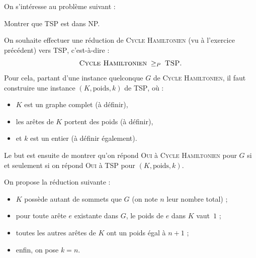 
\begingroup

\begin{exercice}

  On s’intéresse au problème suivant :



  \begin{questions}

  \item Montrer que \textsc{TSP} est dans NP.

    \medskip
    On souhaite effectuer une réduction de \textsc{Cycle Hamiltonien} (vu à l’exercice précédent) vers \textsc{TSP},  
    c’est-à-dire :
    \[
    \textsc{Cycle Hamiltonien} \;\ge_P\; \textsc{TSP}.
    \]
    Pour cela, partant d’une instance quelconque $G$ de \textsc{Cycle Hamiltonien}, il faut construire une instance $(K, \text{poids}, k)$ de \textsc{TSP}, où :
    \begin{itemize}
    \item $K$ est un graphe complet (à définir),
    \item les arêtes de $K$ portent des poids (à définir),
    \item et $k$ est un entier (à définir également).
    \end{itemize}

    Le but est ensuite de montrer qu’on répond \textsc{Oui} à \textsc{Cycle Hamiltonien} pour $G$ si et seulement si on répond \textsc{Oui} à \textsc{TSP} pour $(K, \text{poids}, k)$.

    \medskip
    On propose la réduction suivante :
    \begin{itemize}
    \item $K$ possède autant de sommets que $G$ (on note $n$ leur nombre total) ;
    \item pour toute arête $e$ existante dans $G$, le poids de $e$ dans $K$ vaut~$1$ ;
    \item toutes les autres arêtes de $K$ ont un poids égal à $n + 1$ ;
    \item enfin, on pose $k = n$.
    \end{itemize}


\end{questions}
\end{exercice}
